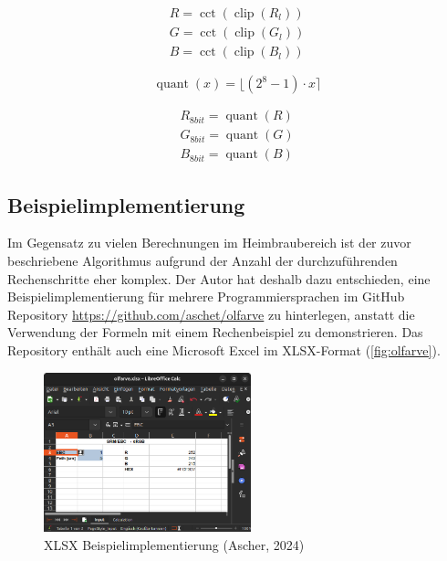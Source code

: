 \documentclass[10pt,a4paper,DIV=12,parskip=half]{scrarticle}
\begin{document}
\begin{equation*}
\begin{gathered}
R = \operatorname{cct}(\operatorname{clip}(R_{l})) \\
G = \operatorname{cct}(\operatorname{clip}(G_{l})) \\
B = \operatorname{cct}(\operatorname{clip}(B_{l}))
\end{gathered}
\end{equation*}

\begin{equation*}
\operatorname{quant}(x) = \lfloor (2^8-1) \cdot x \rceil
\end{equation*}

\begin{equation*}
\begin{gathered}
R_{8bit} = \operatorname{quant}(R) \\
G_{8bit} = \operatorname{quant}(G) \\
B_{8bit} = \operatorname{quant}(B)
\end{gathered}
\end{equation*}

\subsection*{Beispielimplementierung}

Im Gegensatz zu vielen Berechnungen im Heimbraubereich ist der zuvor beschriebene Algorithmus aufgrund der Anzahl der durchzuführenden Rechenschritte eher komplex. Der Autor hat deshalb dazu entschieden, eine Beispielimplementierung für mehrere Programmiersprachen im GitHub Repository \url{https://github.com/aschet/olfarve} zu hinterlegen, anstatt die Verwendung der Formeln mit einem Rechenbeispiel zu demonstrieren. Das Repository enthält auch eine Microsoft Excel im XLSX-Format (\autoref{fig:olfarve}).

\begin{figure}[H]
	\centering
	\includegraphics[width=6cm]{olfarve.png}
	\caption{XLSX Beispielimplementierung (Ascher, 2024)}
	\label{fig:olfarve}
\end{figure}
\end{document}
